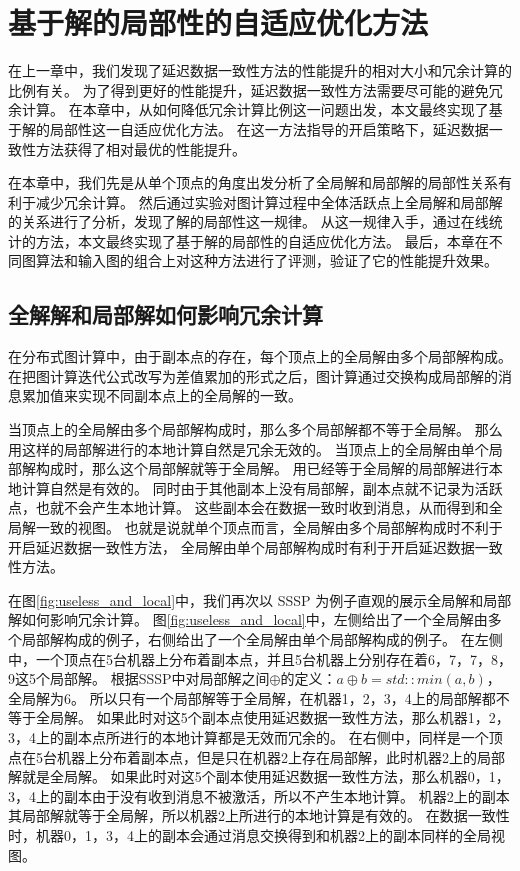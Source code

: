 \chapter{基于解的局部性的自适应优化方法}
在上一章中，我们发现了延迟数据一致性方法的性能提升的相对大小和冗余计算的比例有关。
为了得到更好的性能提升，延迟数据一致性方法需要尽可能的避免冗余计算。
在本章中，从如何降低冗余计算比例这一问题出发，本文最终实现了基于解的局部性这一自适应优化方法。
在这一方法指导的开启策略下，延迟数据一致性方法获得了相对最优的性能提升。

在本章中，我们先是从单个顶点的角度出发分析了全局解和局部解的局部性关系有利于减少冗余计算。
然后通过实验对图计算过程中全体活跃点上全局解和局部解的关系进行了分析，发现了解的局部性这一规律。
从这一规律入手，通过在线统计的方法，本文最终实现了基于解的局部性的自适应优化方法。
最后，本章在不同图算法和输入图的组合上对这种方法进行了评测，验证了它的性能提升效果。

\section{全解解和局部解如何影响冗余计算}

在分布式图计算中，由于副本点的存在，每个顶点上的全局解由多个局部解构成。
在把图计算迭代公式改写为差值累加的形式之后，图计算通过交换构成局部解的消息累加值来实现不同副本点上的全局解的一致。

当顶点上的全局解由多个局部解构成时，那么多个局部解都不等于全局解。
那么用这样的局部解进行的本地计算自然是冗余无效的。
当顶点上的全局解由单个局部解构成时，那么这个局部解就等于全局解。
用已经等于全局解的局部解进行本地计算自然是有效的。
同时由于其他副本上没有局部解，副本点就不记录为活跃点，也就不会产生本地计算。
这些副本会在数据一致时收到消息，从而得到和全局解一致的视图。
也就是说就单个顶点而言，全局解由多个局部解构成时不利于开启延迟数据一致性方法，
全局解由单个局部解构成时有利于开启延迟数据一致性方法。


在图\ref{fig:useless_and_local}中，我们再次以 SSSP 为例子直观的展示全局解和局部解如何影响冗余计算。
图\ref{fig:useless_and_local}中，左侧给出了一个全局解由多个局部解构成的例子，右侧给出了一个全局解由单个局部解构成的例子。
在左侧中，一个顶点在5台机器上分布着副本点，并且5台机器上分别存在着6，7，7，8，9这5个局部解。
根据SSSP中对局部解之间$\oplus$的定义：$a\oplus b=std::min(a,b)$，全局解为6。
所以只有一个局部解等于全局解，在机器1，2，3，4上的局部解都不等于全局解。
如果此时对这5个副本点使用延迟数据一致性方法，那么机器1，2，3，4上的副本点所进行的本地计算都是无效而冗余的。
在右侧中，同样是一个顶点在5台机器上分布着副本点，但是只在机器2上存在局部解，此时机器2上的局部解就是全局解。
如果此时对这5个副本使用延迟数据一致性方法，那么机器0，1，3，4上的副本由于没有收到消息不被激活，所以不产生本地计算。
机器2上的副本其局部解就等于全局解，所以机器2上所进行的本地计算是有效的。
在数据一致性时，机器0，1，3，4上的副本会通过消息交换得到和机器2上的副本同样的全局视图。



